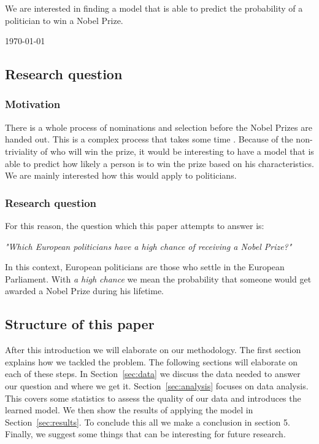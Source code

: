 \documentclass[11pt,journal,compsoc]{IEEEtran}
\begin{document}
We are interested in finding a model that is able to predict the probability of a politician to win a Nobel Prize.


\hfill \today

\subsection{Research question}
\subsubsection{Motivation}
There is a whole process of nominations and selection before the Nobel Prizes are handed out. This is a complex process that takes some time \cite{nobelNomination}.
Because of the non-triviality of who will win the prize, it would be interesting to have a model that is able to predict how likely a person is to win the prize based on his characteristics. We are mainly interested how this would apply to politicians. 
\subsubsection{Research question}
\par For this reason, the question which this paper attempts to answer is:
\begin{center}
\textit{"Which European politicians have a high chance of receiving a Nobel Prize?"}	
\end{center}
In this context, European politicians are those who settle in the European Parliament. With \textit{a high chance} we mean the probability that someone would get awarded a Nobel Prize during his lifetime.

\subsection{Structure of this paper}
After this introduction we will elaborate on our methodology. The first section explains how we tackled the problem. The following sections will elaborate on each of these steps. In Section~\ref{sec:data} we discuss the data needed to answer our question and where we get it. 
Section~\ref{sec:analysis} focuses on data analysis. This covers some statistics to assess the quality of our data and introduces the learned model. We then show the results of applying the model in Section~\ref{sec:results}. To conclude this all we make a conclusion in section 5. Finally, we suggest some things that can be interesting for future research.
\end{document}
